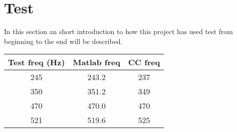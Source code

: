 
\section{Test}
In this section an short introduction to how this project has used test from beginning to the end will be described.

\begin{table}
	\centering
	\begin{tabular}{c c c}
		\toprule
		Test freq (Hz) & Matlab freq & CC freq \\
		\midrule
		\num{245} & \num{243.2} & \num{237}\\
		\num{350} & \num{351.2} & \num{349}\\
		\num{470} & \num{470.0} & \num{470} \\
		\num{521} & \num{519.6} & \num{525} \\
		\bottomrule
	\end{tabular}
\end{table}

\FloatBarrier